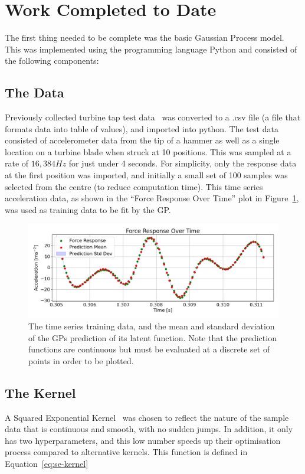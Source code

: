 \documentclass[12pt]{article}
\begin{document}
    \section{Work Completed to Date}
    The first thing needed to be complete was the basic Gaussian Process model.
    This was implemented using the programming language Python and consisted of the following components:
    \subsection{The Data}
    Previously collected turbine tap test data~\cite{MEC326} was converted to a .csv file (a file that formats data into table of values), and imported into python.
    The test data consisted of accelerometer data from the tip of a hammer as well as a single location on a turbine blade when struck at 10 positions.
    This was sampled at a rate of $16,384 Hz$ for just under 4 seconds.
    For simplicity, only the response data at the first position was imported, and initially a small set of 100 samples was selected from the centre (to reduce computation time).
    This time series acceleration data, as shown in the ``Force Response Over Time'' plot in Figure~\ref{fig:input-response-plot}, was used as training data to be fit by the GP\@.

    \begin{figure}[ht]
        \centering
        \includegraphics[width=1.0\linewidth]{figures/input-response-plot/input-response-plot.png}
        \caption{The time series training data, and the mean and standard deviation of the GPs prediction of its latent function. Note that the prediction functions are continuous but must be evaluated at a discrete set of points in order to be plotted.}
        \label{fig:input-response-plot}
    \end{figure}



    \subsection{The Kernel}
    A Squared Exponential Kernel~\cite{duvenaud2014kernel} was chosen to reflect the nature of the sample data that is continuous and smooth, with no sudden jumps.
    In addition, it only has two hyperparameters, and this low number speeds up their optimisation process compared to alternative kernels.
    This function is defined in Equation~\ref{eq:se-kernel}
\end{document}
